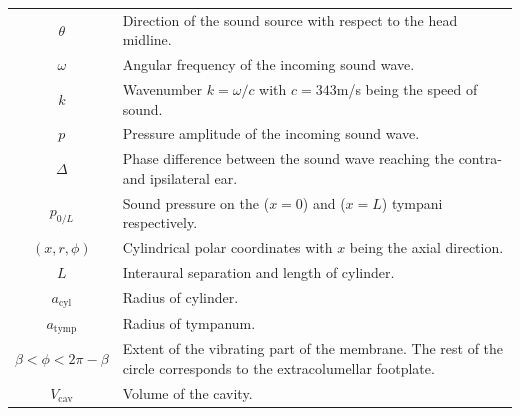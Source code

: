 \noindent
\begin{minipage}{\linewidth}
\renewcommand{\arraystretch}{1.1}
\centering
{} \label{parametertable} 
\begin{tabular}{c p{12 cm}}
\hline
$\theta$ & Direction of the sound source with respect to the head midline.\\
$\omega$ & Angular frequency of the incoming sound wave.\\
$k$ & Wavenumber $k=\omega/c$ with $c=343$m/s being the speed of sound.\\
$p$ & Pressure amplitude of the incoming sound wave.\\
$\Delta$ & Phase difference between the sound wave reaching the contra- and ipsilateral ear.\\
$p_{0/L}$ & Sound pressure on the ($x=0$) and ($x=L$) tympani respectively.\\
$(x,r,\phi)$ & Cylindrical polar coordinates with $x$ being the axial direction.\\
$L$ & Interaural separation and length of cylinder.\\
$a_{\mathrm{cyl}}$ & Radius of cylinder.\\
$a_{\mathrm{tymp}}$ & Radius of tympanum.\\
$\beta<\phi<2\pi-\beta$ & Extent of the vibrating part of the membrane. The rest of the circle corresponds to
the extracolumellar footplate.\\
$V_{\mathrm{cav}}$ & Volume of the cavity.\\
\hline
\end {tabular}\par
\bigskip
\end{minipage}

